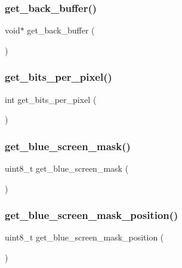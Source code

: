 \subsubsection{\texorpdfstring{get\_back\_buffer()}{get\_back\_buffer()}}
{\footnotesize\ttfamily void$\ast$ get\+\_\+back\+\_\+buffer (\begin{DoxyParamCaption}{ }\end{DoxyParamCaption})}

\mbox{\label{group__video_ga93c2bd40f276f3ac190868b704a0b460}} 
\subsubsection{\texorpdfstring{get\_bits\_per\_pixel()}{get\_bits\_per\_pixel()}}
{\footnotesize\ttfamily int get\+\_\+bits\+\_\+per\+\_\+pixel (\begin{DoxyParamCaption}{ }\end{DoxyParamCaption})}

\mbox{\label{group__video_ga6929228fd26ebbf17efe05d9a72658a7}} 
\subsubsection{\texorpdfstring{get\_blue\_screen\_mask()}{get\_blue\_screen\_mask()}}
{\footnotesize\ttfamily uint8\+\_\+t get\+\_\+blue\+\_\+screen\+\_\+mask (\begin{DoxyParamCaption}{ }\end{DoxyParamCaption})}

\mbox{\label{group__video_gae739d88cacef84ab9c419526fd0cc635}} 
\subsubsection{\texorpdfstring{get\_blue\_screen\_mask\_position()}{get\_blue\_screen\_mask\_position()}}
{\footnotesize\ttfamily uint8\+\_\+t get\+\_\+blue\+\_\+screen\+\_\+mask\+\_\+position (\begin{DoxyParamCaption}{ }\end{DoxyParamCaption})}

